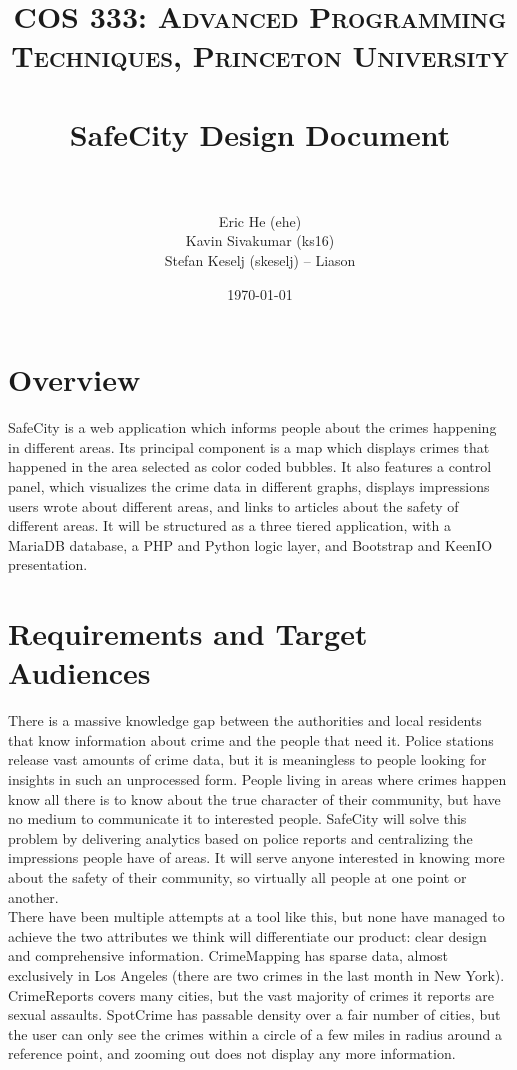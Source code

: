 \documentclass[paper=a4, fontsize=11pt]{scrartcl} %
\title{	
\normalfont \normalsize 
\textsc{COS 333: Advanced Programming Techniques, Princeton University} \\ [25pt] %
\horrule{0.5pt} \\[0.4cm] %
\huge SafeCity Design Document \\ %
\horrule{2pt} \\[0.5cm] %
}
\author{
Eric He (ehe) \\
Kavin Sivakumar (ks16) \\
Stefan Keselj (skeselj) -- Liason}
\date{\normalsize\today} %
\numberwithin{equation}{section} %
\numberwithin{figure}{section} %
\numberwithin{table}{section} %
\begin{document}
\maketitle %


\section{Overview}

SafeCity is a web application which informs people about the crimes happening in different areas. Its principal component is a map which displays crimes that happened in the area selected as color coded bubbles. It also features a control panel, which visualizes the crime data in different graphs, displays impressions users wrote about different areas, and links to articles about the safety of different areas. It will be structured as a three tiered application, with a MariaDB database, a PHP and Python logic layer, and Bootstrap and KeenIO presentation.


\section{Requirements and Target Audiences}

There is a massive knowledge gap between the authorities and local residents that know information about crime and the people that need it. Police stations release vast amounts of crime data, but it is meaningless to people looking for insights in such an unprocessed form. People living in areas where crimes happen know all there is to know about the true character of their community, but have no medium to communicate it to interested people. SafeCity will solve this problem by delivering analytics based on police reports and centralizing the impressions people have of areas. It will serve anyone interested in knowing more about the safety of their community, so virtually all people at one point or another. \\

There have been multiple attempts at a tool like this, but none have managed to achieve the two attributes we think will differentiate our product: clear design and comprehensive information. CrimeMapping has sparse data, almost exclusively in Los Angeles (there are two crimes in the last month in New York). CrimeReports covers many cities, but the vast majority of crimes it reports are sexual assaults. SpotCrime has passable density over a fair number of cities, but the user can only see the crimes within a circle of a few miles in radius around a reference point, and zooming out does not display any more information. \\
\end{document}

